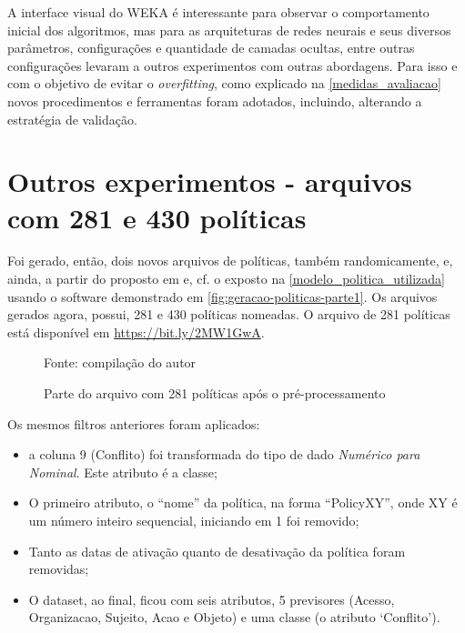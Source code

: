 A interface visual do WEKA é interessante para observar o comportamento inicial dos algoritmos, mas para as arquiteturas de redes neurais e seus diversos parâmetros, configurações e quantidade de camadas ocultas, entre outras configurações levaram a outros experimentos com outras abordagens. Para isso e com o objetivo de evitar o \textit{overfitting}, como explicado na \autoref{medidas_avaliacao} novos procedimentos e ferramentas foram adotados, incluindo, alterando a estratégia de validação.

\section{Outros experimentos - arquivos com 281 e 430 políticas}\label{exp:139-281}
Foi gerado, então, dois novos arquivos de políticas, também randomicamente, e, ainda, a partir do proposto em  e, cf. o exposto na \autoref{modelo_politica_utilizada} usando o software demonstrado em \ref{fig:geracao-politicas-parte1}. Os arquivos gerados agora, possui, 281 e 430 políticas nomeadas. O arquivo de 281 políticas está disponível em \hyperlink{https://bit.ly/2MW1GwA}{https://bit.ly/2MW1GwA}.

\begin{figure}[h!]
	\centering
	\caption{Parte do arquivo com 281 políticas após o pré-processamento}
	
	\label{fig:dataset-281}
	{\scriptsize Fonte: compilação do autor}
\end{figure}

Os mesmos filtros anteriores foram aplicados:\begin{itemize} \label{filtros}
	\item a coluna 9 (Conflito) foi transformada do tipo de dado \textit{Numérico para Nominal}. Este atributo é a classe;
	\item O primeiro atributo, o ``nome'' da política, na forma ``PolicyXY'', onde XY é um número inteiro sequencial, iniciando em 1 foi removido;
	\item Tanto as datas de ativação quanto de desativação da política foram removidas;
	\item O dataset, ao final, ficou com seis atributos, 5 previsores (Acesso, Organizacao, Sujeito, Acao e Objeto) e uma classe (o atributo `Conflito').
\end{itemize}

